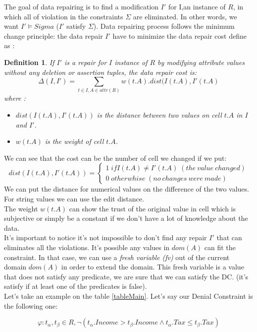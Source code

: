 \documentclass[letterpaper, 12pt]{report}
\newtheorem{mydef}{Definition}
\begin{document}
The goal of data repairing is to find a modification $I'$ for I,an instance of $R$, in which all of violation in the constraints $\Sigma$ are eliminated. In other words, we want $I' \models Sigma$ ($I'$ satisfy $\Sigma$). Data repairing process follows the minimum change principle: the data repair $I'$ have to minimize the data repair cost define as \cite{main}:
\begin{mydef}
If $I'$ is a repair for $I$ instance of $R$ by modifying attribute values without any deletion or assertion tuples, the data repair cost is:
$$ \Delta(I,I') = \sum_{t \in I, A \in attr(R)} w(t.A).dist(I(t.A),I'(t.A) $$
where :
\begin{itemize}
	\item $dist(I(t.A),I'(t.A))$ is the distance between two values on cell $t.A$ in $I$ and $I'$.
	\item $w(t.A)$ is the weight of cell $t.A$.
\end{itemize}
\end{mydef}

We can see that the cost can be the number of cell we changed if we put:
$$
dist(I(t.A),I'(t.A)) =
\left\{
	\begin{array}{ll}
	  1 \; if I(t.A) \neq I'(t.A)\;(the\ value\ changed) \\
	  0 \; otherwhise\;(no\ changes\ were\ made)
	\end{array}
\right.
$$
We can put the distance for numerical values on the difference of the two values. For string values we can use the edit distance.\\

The weight $w(t.A)$ can show the trust of the original value in cell which is subjective or simply be a constant if we don't have a lot of knowledge about the data.\\

It's important to notice it's not impossible to don't find any repair $I'$ that can eliminates all the violations. It's possible any values in $dom(A)$ can fit the constraint. In that case, we can use a \emph{fresh variable (fv)} out of the current domain $dom(A)$ in order to extend the domain. This fresh variable is a value that does not satisfy any predicate, we are sure that we can satisfy the DC. (it's satisfy if at least one of the predicates is false).\\

Let's take an example on the table \ref{tableMain}. Let's say our Denial Constraint is the following one:

$$ \varphi : t_\alpha,t_\beta \in R, \neg(t_\alpha.Income > t_\beta.Income \wedge t_\alpha.Tax \leq t_\beta.Tax)$$
\end{document}
